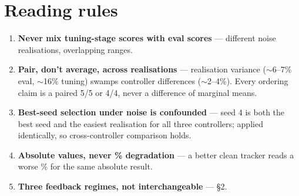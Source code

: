 \documentclass[11pt]{article}
\begin{document}
\section{Reading rules}
\begin{enumerate}[nosep]
\item \textbf{Never mix tuning-stage scores with eval scores} --- different noise
      realisations, overlapping ranges.
\item \textbf{Pair, don't average, across realisations} --- realisation variance
      ($\sim$6--7\% eval, $\sim$16\% tuning) swamps controller differences
      ($\sim$2--4\%). Every ordering claim is a paired 5/5 or 4/4, never a difference of
      marginal means.
\item \textbf{Best-seed selection under noise is confounded} --- seed 4 is both the best
      seed and the easiest realisation for all three controllers; applied identically,
      so cross-controller comparison holds.
\item \textbf{Absolute values, never \% degradation} --- a better clean tracker reads a
      worse \% for the same absolute result.
\item \textbf{Three feedback regimes, not interchangeable} --- \S2.
\end{enumerate}
\end{document}
